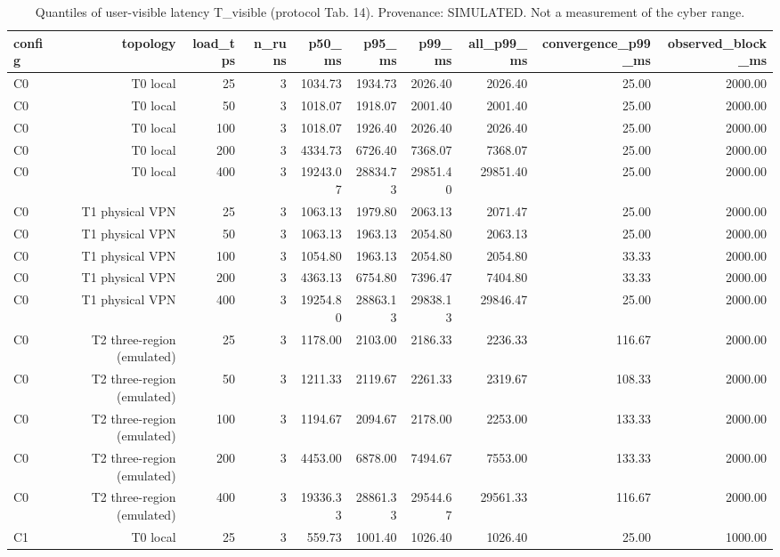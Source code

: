 \begin{table}[t]
\caption{Quantiles of user-visible latency T\_visible (protocol Tab. 14). Provenance: SIMULATED.  Not a measurement of the cyber range.}
\label{tab:table14_latency_quantiles}
\centering
\begin{tabular}{lrrrrrrrrr}
\hline
config & topology & load\_tps & n\_runs & p50\_ms & p95\_ms & p99\_ms & all\_p99\_ms & convergence\_p99\_ms & observed\_block\_ms \\
\hline
C0 & T0 local & 25 & 3 & 1034.73 & 1934.73 & 2026.40 & 2026.40 & 25.00 & 2000.00 \\
C0 & T0 local & 50 & 3 & 1018.07 & 1918.07 & 2001.40 & 2001.40 & 25.00 & 2000.00 \\
C0 & T0 local & 100 & 3 & 1018.07 & 1926.40 & 2026.40 & 2026.40 & 25.00 & 2000.00 \\
C0 & T0 local & 200 & 3 & 4334.73 & 6726.40 & 7368.07 & 7368.07 & 25.00 & 2000.00 \\
C0 & T0 local & 400 & 3 & 19243.07 & 28834.73 & 29851.40 & 29851.40 & 25.00 & 2000.00 \\
C0 & T1 physical VPN & 25 & 3 & 1063.13 & 1979.80 & 2063.13 & 2071.47 & 25.00 & 2000.00 \\
C0 & T1 physical VPN & 50 & 3 & 1063.13 & 1963.13 & 2054.80 & 2063.13 & 25.00 & 2000.00 \\
C0 & T1 physical VPN & 100 & 3 & 1054.80 & 1963.13 & 2054.80 & 2054.80 & 33.33 & 2000.00 \\
C0 & T1 physical VPN & 200 & 3 & 4363.13 & 6754.80 & 7396.47 & 7404.80 & 33.33 & 2000.00 \\
C0 & T1 physical VPN & 400 & 3 & 19254.80 & 28863.13 & 29838.13 & 29846.47 & 25.00 & 2000.00 \\
C0 & T2 three-region (emulated) & 25 & 3 & 1178.00 & 2103.00 & 2186.33 & 2236.33 & 116.67 & 2000.00 \\
C0 & T2 three-region (emulated) & 50 & 3 & 1211.33 & 2119.67 & 2261.33 & 2319.67 & 108.33 & 2000.00 \\
C0 & T2 three-region (emulated) & 100 & 3 & 1194.67 & 2094.67 & 2178.00 & 2253.00 & 133.33 & 2000.00 \\
C0 & T2 three-region (emulated) & 200 & 3 & 4453.00 & 6878.00 & 7494.67 & 7553.00 & 133.33 & 2000.00 \\
C0 & T2 three-region (emulated) & 400 & 3 & 19336.33 & 28861.33 & 29544.67 & 29561.33 & 116.67 & 2000.00 \\
C1 & T0 local & 25 & 3 & 559.73 & 1001.40 & 1026.40 & 1026.40 & 25.00 & 1000.00 \\

\end{tabular}
\end{table}
